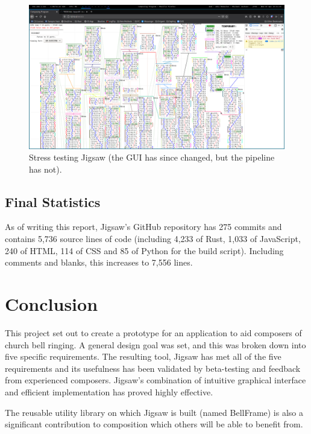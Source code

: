 \documentclass[12pt]{article}
\begin{document}
\begin{figure}
    \centering
    \includegraphics[width=\textwidth]{stress-test}
    \caption{Stress testing Jigsaw (the GUI has since changed, but the pipeline has
    not).}\label{fig:stress-test}
\end{figure}

\subsection{Final Statistics}

As of writing this report, Jigsaw's GitHub repository has 275 commits and contains 5,736 source
lines of code (including 4,233 of Rust, 1,033 of JavaScript, 240 of HTML, 114 of CSS and 85 of
Python for the build script).  Including comments and blanks, this increases to 7,556 lines.



\pagebreak

\section{Conclusion}

This project set out to create a prototype for an application to aid composers of church bell
ringing.  A general design goal was set, and this was broken down into five specific requirements.
The resulting tool, Jigsaw has met all of the five requirements and its usefulness has been
validated by beta-testing and feedback from experienced composers. Jigsaw's combination of intuitive
graphical interface and efficient implementation has proved highly effective.

The reusable utility library on which Jigsaw is built (named BellFrame) is also a significant
contribution to composition which others will be able to benefit from.
\end{document}

